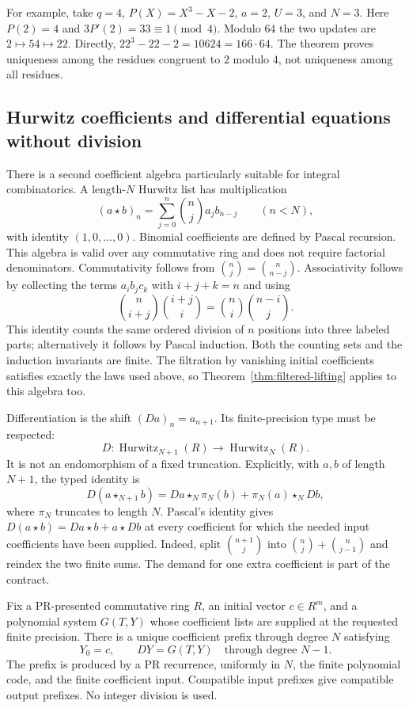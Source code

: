 For example, take $q=4$, $P(X)=X^3-X-2$, $a=2$, $U=3$, and $N=3$.
Here $P(2)=4$ and $3P'(2)=33\equiv1\pmod4$.  Modulo $64$ the two
updates are $2\mapsto54\mapsto22$.  Directly,
$22^3-22-2=10624=166\cdot64$.  The theorem proves uniqueness among the
residues congruent to $2$ modulo $4$, not uniqueness among all residues.

\subsection{Hurwitz coefficients and differential equations without division}

There is a second coefficient algebra particularly suitable for integral
combinatorics.  A length-$N$ Hurwitz list has multiplication
\[
 (a\star b)_n=\sum_{j=0}^n\binom nj a_jb_{n-j}\qquad(n<N),       \tag{6}
\]
with identity $(1,0,\ldots,0)$.  Binomial coefficients are defined by
Pascal recursion.  This algebra is valid over any commutative ring and
does not require factorial denominators.  Commutativity follows from
$\binom nj=\binom n{n-j}$.  Associativity follows by collecting the terms
$a_i b_j c_k$ with $i+j+k=n$ and using
\[
 \binom n{i+j}\binom{i+j}i
   =\binom ni\binom{n-i}j.
\]
This identity counts the same ordered division of $n$ positions into
three labeled parts; alternatively it follows by Pascal induction.  Both
the counting sets and the induction invariants are finite.  The filtration
by vanishing initial coefficients satisfies exactly the laws used above,
so Theorem~\ref{thm:filtered-lifting} applies to this algebra too.

Differentiation is the shift $(Da)_n=a_{n+1}$.  Its finite-precision type
must be respected:
\[
 D:\operatorname{Hurwitz}_{N+1}(R)\longrightarrow
       \operatorname{Hurwitz}_{N}(R).                         \tag{7}
\]
It is not an endomorphism of a fixed truncation. Explicitly, with
$a,b$ of length $N+1$, the typed identity is
\[
 D(a\star_{N+1}b)=Da\star_N\pi_N(b)+\pi_N(a)\star_N Db,
\]
where $\pi_N$ truncates to length $N$. Pascal's identity gives
$D(a\star b)=Da\star b+a\star Db$ at every coefficient for which the
needed input coefficients have been supplied.  Indeed, split
$\binom{n+1}j$ into $\binom nj+\binom n{j-1}$ and reindex the two finite
sums.  The demand for one extra coefficient is part of the contract.

\begin{theorem}
\label{thm:hurwitz-ode}
Fix a PR-presented commutative ring $R$, an initial vector $c\in R^m$,
and a polynomial system $G(T,Y)$ whose coefficient lists are supplied at
the requested finite precision.  There is a unique coefficient prefix
through degree $N$ satisfying
\[
 Y_0=c,\qquad DY=G(T,Y)\quad\text{through degree }N-1.          \tag{8}
\]
The prefix is produced by a PR recurrence, uniformly in $N$, the finite
polynomial code, and the finite coefficient input.  Compatible input
prefixes give compatible output prefixes.  No integer division is used.
\end{theorem}

